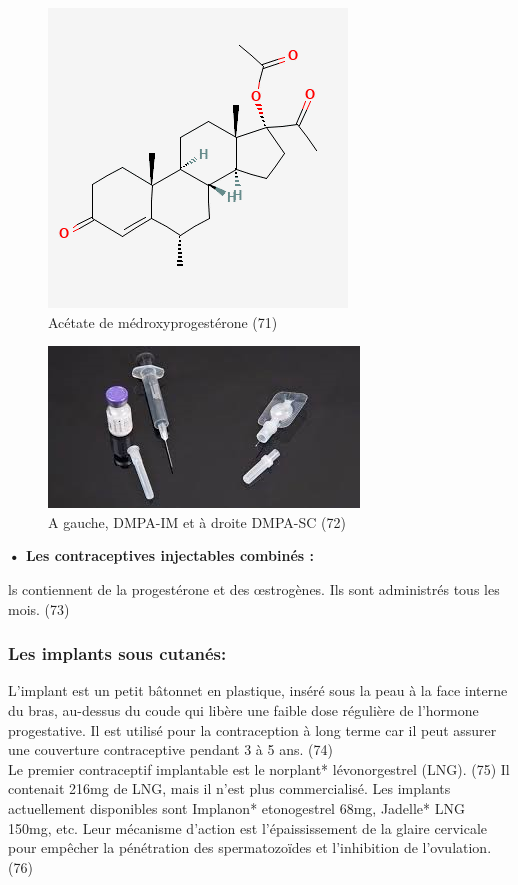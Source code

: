 \begin{figure}[H]
  \centering
  \includegraphics{Images/fig_38.png}
  \caption{Acétate de médroxyprogestérone (71)}  
\end{figure}


\begin{figure}[H]
  \centering
  \includegraphics{Images/fig_39.jpg}
  \caption{A gauche, DMPA-IM et à droite DMPA-SC (72)}
  
\end{figure}

\hspace{1em}\textbf{•	Les contraceptives injectables combinés : }\vspace*{1em}

\noindent ls contiennent de la progestérone et des œstrogènes. Ils sont administrés tous les mois. (73)

\subsubsection{Les implants sous cutanés: }
L’implant est un petit bâtonnet en plastique, inséré sous la peau à la face interne du bras, au-dessus du coude qui libère une faible dose régulière de l’hormone progestative. Il est utilisé pour la contraception à long terme car il peut assurer une couverture contraceptive pendant 3 à 5 ans. (74) \\
\noindent Le premier contraceptif implantable est le norplant* lévonorgestrel (LNG). (75) Il contenait 216mg de LNG, mais il n’est plus commercialisé. Les implants actuellement disponibles sont Implanon* etonogestrel 68mg, Jadelle* LNG 150mg, etc. Leur mécanisme d’action est l’épaississement de la glaire cervicale pour empêcher la pénétration des spermatozoïdes et l’inhibition de l’ovulation. (76)\\

